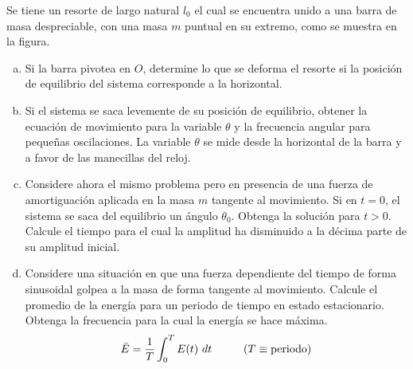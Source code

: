 
\newcommand*\plusc{\begin{tikzpicture} \draw[->] (0,-1) arc (-90:90:0.3) node[left,pos=0.5,xshift=2] {\(+\)};\end{tikzpicture}}

\item Se tiene un resorte de largo natural $l_0$ el cual se encuentra unido a una barra de masa despreciable, con una masa $m$ puntual en su extremo, como se muestra en la figura.

\begin{enumerate}[a)]
	\item Si la barra pivotea en $O$, determine lo que se deforma el resorte si la posición de equilibrio del sistema corresponde a la horizontal.
	\item Si el sistema se saca levemente de su posición de equilibrio, obtener la ecuación de movimiento para la variable $\theta$ y la frecuencia angular para pequeñas oscilaciones. La variable $\theta$ se mide desde la horizontal de la barra y a favor de las manecillas del reloj.
	\item Considere ahora el mismo problema pero en presencia de una fuerza de amortiguación aplicada en la masa $m$ tangente al movimiento. Si en $t=0$, el sistema se saca del equilibrio un ángulo $\theta_0$. Obtenga la solución para $t>0$. Calcule el tiempo para el cual la amplitud ha disminuido a la décima parte de su amplitud inicial.
	\item Considere una situación en que una fuerza dependiente del tiempo de forma sinusoidal golpea a la masa de forma tangente al movimiento. Calcule el promedio de la energía para un periodo de tiempo en estado estacionario. Obtenga la frecuencia para la cual la energía se hace máxima.
	\begin{equation*}
		\bar{E} = \dfrac{1}{T} \int_0^T E(t) \ dt \hspace{10mm} (T \equiv \text{periodo})
	\end{equation*}
\end{enumerate}

